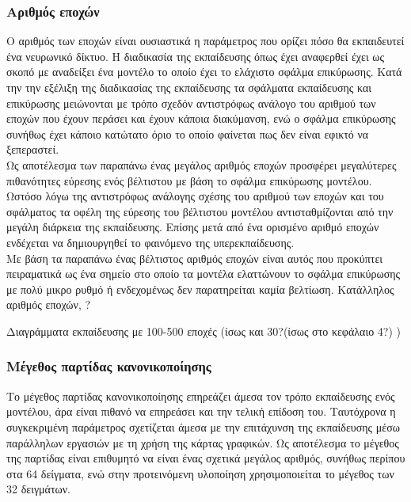 \subsubsection{Αριθμός εποχών}
Ο αριθμός των εποχών είναι ουσιαστικά η παράμετρος που ορίζει πόσο θα εκπαιδευτεί ένα νευρωνικό δίκτυο. Η διαδικασία της εκπαίδευσης όπως έχει αναφερθεί έχει ως σκοπό με αναδείξει ένα μοντέλο το οποίο έχει το ελάχιστο σφάλμα επικύρωσης. Κατά την την εξέλιξη της διαδικασίας της εκπαίδευσης τα σφάλματα εκπαίδευσης και επικύρωσης μειώνονται με τρόπο σχεδόν αντιστρόφως ανάλογο του αριθμού των εποχών που έχουν περάσει και έχουν κάποια διακύμανση, ενώ ο σφάλμα επικύρωσης συνήθως έχει κάποιο κατώτατο όριο το οποίο φαίνεται πως δεν είναι εφικτό να ξεπεραστεί.\\

Ως αποτέλεσμα των παραπάνω ένας μεγάλος αριθμός εποχών προσφέρει μεγαλύτερες πιθανότητες εύρεσης ενός βέλτιστου με βάση το σφάλμα επικύρωσης μοντέλου. Ωστόσο λόγω της αντιστρόφως ανάλογης σχέσης του αριθμού των εποχών και του σφάλματος τα οφέλη της εύρεσης του βέλτιστου μοντέλου αντισταθμίζονται από την μεγάλη διάρκεια της εκπαίδευσης. Επίσης μετά από ένα ορισμένο αριθμό εποχών ενδέχεται να δημιουργηθεί το φαινόμενο της υπερεκπαίδευσης.\\

Με βάση τα παραπάνω ένας βέλτιστος αριθμός εποχών είναι αυτός που προκύπτει πειραματικά ως ένα σημείο στο οποίο τα μοντέλα ελαττώνουν το σφάλμα επικύρωσης με πολύ μικρο ρυθμό ή ενδεχομένως δεν παρατηρείται καμία βελτίωση.
Κατάλληλος αριθμός εποχών, ?

Διαγράμματα εκπαίδευσης με 100-500 εποχές (ίσως και 30?(ίσως στο κεφάλαιο 4?) )


\subsubsection{Μέγεθος παρτίδας κανονικοποίησης}
Το μέγεθος παρτίδας κανονικοποίησης επηρεάζει άμεσα τον τρόπο εκπαίδευσης ενός μοντέλου, άρα είναι πιθανό να επηρεάσει και την τελική επίδοση του. Ταυτόχρονα η συγκεκριμένη παράμετρος σχετίζεται άμεσα με την επιτάχυνση της εκπαίδευσης μέσω παράλληλων εργασιών με τη χρήση της κάρτας γραφικών. Ως αποτέλεσμα  το μέγεθος της παρτίδας είναι επιθυμητό να είναι ένας σχετικά μεγάλος αριθμός, συνήθως περίπου στα 64 δείγματα, ενώ στην προτεινόμενη υλοποίηση χρησιμοποιείται το μέγεθος των 32 δειγμάτων.

